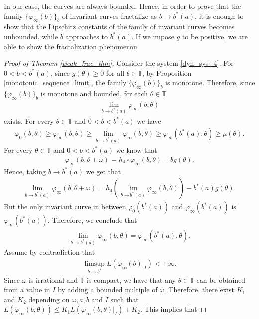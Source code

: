 \documentclass[12pt]{article}
\newcommand{\T}{\mathbb{T}}
\theoremstyle{plain}
\theoremstyle{remark}
\theoremstyle{definition}
\begin{document}
In our case, the curves are always bounded. Hence, in order to prove that the family $\{\varphi_\infty(b)\}_b$ of invariant curves fractalize as $b\to b^*(a)$, it is enough to show that the Lipschitz constants of the family of invariant curves becomes unbounded, while $b$ approaches to $b^*(a)$. If we impose $g$ to be positive, we are able to show the fractalization phenomenon.
\begin{proof}[Proof of Theorem \ref{weak_frac_thm}]
    Consider the system \eqref{dyn_sys_4}. For $0<b<b^*(a)$, since $g(\theta)\geq0$ for all $\theta\in\T$, by Proposition \ref{monotonic_sequence_limit}, the family $\{\varphi_\infty(b)\}_b$ is monotone. Therefore, since $\{\varphi_\infty(b)\}_b$ is monotone and bounded, for each $\theta\in\T$
    \begin{align*}
        \lim_{b\to b^*(a)} \varphi_\infty(b,\theta)
    \end{align*}
    exists. For every $\theta\in\T$ and $0<b<b^*(a)$ we have
    \begin{align*}
        \varphi_0(b,\theta)\geq \varphi_\infty(b,\theta) \geq \lim_{b\to b^*(a)} \varphi_\infty(b,\theta)\geq \varphi_\infty(b^*(a),\theta)\geq \mu(\theta).
    \end{align*}
    For every $\theta\in\T$ and $0<b<b^*(a)$ we know that
    \begin{align*}
        \varphi_\infty(b,\theta+\omega) = h_4\circ\varphi_\infty(b,\theta) - b g(\theta).
    \end{align*}
    Hence, taking $b\to b^*(a)$ we get that
    \begin{align*}
        \lim_{b\to b^*(a)}\varphi_\infty(b,\theta+\omega) = h_4\left(\lim_{b\to b^*(a)}\varphi_\infty(b,\theta)\right) - b^*(a) g(\theta).
    \end{align*}
    But the only invariant curve in between $\varphi_0(b^*(a))$ and $\varphi_\infty(b^*(a))$ is $\varphi_\infty(b^*(a))$. Therefore, we conclude that
    \begin{align*}
        \lim_{b\to b^*(a)} \varphi_\infty(b,\theta) = \varphi_\infty(b^*(a),\theta).
    \end{align*}
    Assume by contradiction that
    \begin{align*}
            \limsup_{b\to b^*} L(\varphi_\infty(b)|_I) < +\infty.
    \end{align*}
    Since $\omega$ is irrational and $\T$ is compact, we have that any $\theta\in\T$ can be obtained from a value in $I$ by adding a bounded multiple of $\omega$. Therefore, there exist $K_1$ and $K_2$ depending on $\omega,a,b$ and $I$ such that $L(\varphi_\infty(b,\theta))\leq K_1 L(\varphi_\infty(b,\theta)|_I) + K_2$. This implies that 

\end{proof}
\end{document}
